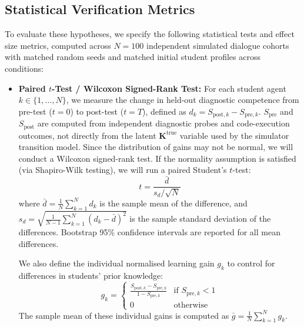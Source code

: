 \documentclass[11pt,a4paper]{report}
\begin{document}
\subsection{Statistical Verification Metrics}
To evaluate these hypotheses, we specify the following statistical tests and effect size metrics, computed across $N = 100$ independent simulated dialogue cohorts with matched random seeds and matched initial student profiles across conditions:
\begin{itemize}
    \item \textbf{Paired $t$-Test / Wilcoxon Signed-Rank Test:} For each student agent $k \in \{1, \dots, N\}$, we measure the change in held-out diagnostic competence from pre-test ($t=0$) to post-test ($t=T$), defined as $d_k = S_{\text{post}, k} - S_{\text{pre}, k}$. $S_{\text{pre}}$ and $S_{\text{post}}$ are computed from independent diagnostic probes and code-execution outcomes, not directly from the latent $\mathbf{K}^{\text{true}}$ variable used by the simulator transition model. Since the distribution of gains may not be normal, we will conduct a Wilcoxon signed-rank test. If the normality assumption is satisfied (via Shapiro-Wilk testing), we will run a paired Student's $t$-test:
    \begin{equation}
        t = \frac{\bar{d}}{s_d / \sqrt{N}}
    \end{equation}
    where $\bar{d} = \frac{1}{N} \sum_{k=1}^N d_k$ is the sample mean of the difference, and $s_d = \sqrt{\frac{1}{N-1} \sum_{k=1}^N (d_k - \bar{d})^2}$ is the sample standard deviation of the differences. Bootstrap 95\% confidence intervals are reported for all mean differences.

    We also define the individual normalised learning gain $g_k$ to control for differences in students' prior knowledge:
    \begin{equation}
        g_k = \begin{cases}
            \frac{S_{\text{post}, k} - S_{\text{pre}, k}}{1 - S_{\text{pre}, k}} & \text{if } S_{\text{pre}, k} < 1 \\
            0 & \text{otherwise}
        \end{cases}
    \end{equation}
    The sample mean of these individual gains is computed as $\bar{g} = \frac{1}{N} \sum_{k=1}^N g_k$.


\end{itemize}
\end{document}
